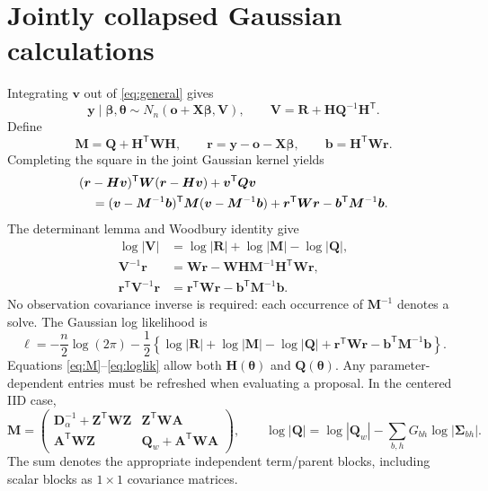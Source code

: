 \documentclass[11pt]{article}
\newcommand{\by}{\bm{y}}
\newcommand{\bo}{\bm{o}}
\newcommand{\bv}{\bm{v}}
\newcommand{\br}{\bm{r}}
\newcommand{\bb}{\bm{b}}
\newcommand{\bbeta}{\bm{\beta}}
\newcommand{\btheta}{\bm{\theta}}
\newcommand{\bA}{\bm{A}}
\newcommand{\bD}{\bm{D}}
\newcommand{\bH}{\bm{H}}
\newcommand{\bM}{\bm{M}}
\newcommand{\bQ}{\bm{Q}}
\newcommand{\bR}{\bm{R}}
\newcommand{\bV}{\bm{V}}
\newcommand{\bW}{\bm{W}}
\newcommand{\bX}{\bm{X}}
\newcommand{\bZ}{\bm{Z}}
\newcommand{\bSigma}{\bm{\Sigma}}
\newcommand{\trans}{^{\mathsf T}}
\begin{document}
\section{Jointly collapsed Gaussian calculations}
Integrating $\bv$ out of \eqref{eq:general} gives
\begin{equation}\label{eq:marginal}
 \by\mid\bbeta,\btheta\sim N_n(\bo+\bX\bbeta,\bV),\qquad
 \bV=\bR+\bH\bQ^{-1}\bH\trans.
\end{equation}
Define
\begin{equation}\label{eq:M}
 \bM=\bQ+\bH\trans\bW\bH,\qquad
 \br=\by-\bo-\bX\bbeta,\qquad \bb=\bH\trans\bW\br.
\end{equation}
Completing the square in the joint Gaussian kernel yields
\begin{align}
 &(\br-\bH\bv)\trans\bW(\br-\bH\bv)+\bv\trans\bQ\bv\notag\\
 &\quad=(\bv-\bM^{-1}\bb)\trans\bM(\bv-\bM^{-1}\bb)
       +\br\trans\bW\br-\bb\trans\bM^{-1}\bb.
\end{align}
The determinant lemma and Woodbury identity give
\begin{align}
 \log|\bV|&=\log|\bR|+\log|\bM|-\log|\bQ|,\label{eq:det}\\
 \bV^{-1}\br&=\bW\br-\bW\bH\bM^{-1}\bH\trans\bW\br,\label{eq:solve}\\
 \br\trans\bV^{-1}\br&=\br\trans\bW\br-\bb\trans\bM^{-1}\bb.\label{eq:quad}
\end{align}
No observation covariance inverse is required: each occurrence of $\bM^{-1}$
denotes a solve. The Gaussian log likelihood is
\begin{equation}\label{eq:loglik}
 \ell=-\frac n2\log(2\pi)-\frac12\left\{
 \log|\bR|+\log|\bM|-\log|\bQ|
 +\br\trans\bW\br-\bb\trans\bM^{-1}\bb\right\}.
\end{equation}
Equations \eqref{eq:M}--\eqref{eq:loglik} allow both $\bH(\btheta)$ and
$\bQ(\btheta)$. Any parameter-dependent entries must be refreshed when evaluating
a proposal. In the centered IID case,
\begin{equation}\label{eq:M-blocks}
 \bM=\begin{pmatrix}
 \bD_\alpha^{-1}+\bZ\trans\bW\bZ & \bZ\trans\bW\bA\\
 \bA\trans\bW\bZ & \bQ_w+\bA\trans\bW\bA
 \end{pmatrix},\qquad
 \log|\bQ|=\log|\bQ_w|-\sum_{b,h}G_{bh}\log|\bSigma_{bh}|.
\end{equation}
The sum denotes the appropriate independent term/parent blocks, including scalar
blocks as $1\times1$ covariance matrices.
\end{document}
